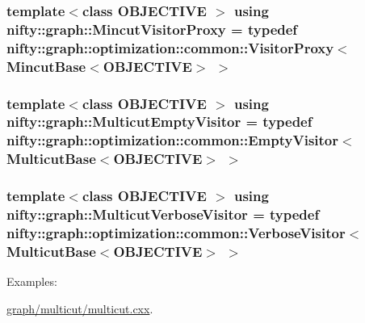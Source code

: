 \subsubsection[{Mincut\+Visitor\+Proxy}]{\setlength{\rightskip}{0pt plus 5cm}template$<$class O\+B\+J\+E\+C\+T\+I\+V\+E $>$ using {\bf nifty\+::graph\+::\+Mincut\+Visitor\+Proxy} = typedef {\bf nifty\+::graph\+::optimization\+::common\+::\+Visitor\+Proxy}$<$ {\bf Mincut\+Base}$<$O\+B\+J\+E\+C\+T\+I\+V\+E$>$ $>$}\label{namespacenifty_1_1graph_ac6c35595563f4188e7cbac37871801b8}
\hypertarget{namespacenifty_1_1graph_a37de21ae53be2952a5876727dadceed1}{}
\subsubsection[{Multicut\+Empty\+Visitor}]{\setlength{\rightskip}{0pt plus 5cm}template$<$class O\+B\+J\+E\+C\+T\+I\+V\+E $>$ using {\bf nifty\+::graph\+::\+Multicut\+Empty\+Visitor} = typedef {\bf nifty\+::graph\+::optimization\+::common\+::\+Empty\+Visitor}$<$ {\bf Multicut\+Base}$<$O\+B\+J\+E\+C\+T\+I\+V\+E$>$ $>$}\label{namespacenifty_1_1graph_a37de21ae53be2952a5876727dadceed1}
\hypertarget{namespacenifty_1_1graph_a8b139ea9e1b9c08234fb388f35bd9e75}{}
\subsubsection[{Multicut\+Verbose\+Visitor}]{\setlength{\rightskip}{0pt plus 5cm}template$<$class O\+B\+J\+E\+C\+T\+I\+V\+E $>$ using {\bf nifty\+::graph\+::\+Multicut\+Verbose\+Visitor} = typedef {\bf nifty\+::graph\+::optimization\+::common\+::\+Verbose\+Visitor}$<$ {\bf Multicut\+Base}$<$O\+B\+J\+E\+C\+T\+I\+V\+E$>$ $>$}\label{namespacenifty_1_1graph_a8b139ea9e1b9c08234fb388f35bd9e75}
\begin{Desc}
\item[Examples\+: ]\par
\hyperlink{graph_2multicut_2multicut_8cxx-example}{graph/multicut/multicut.\+cxx}.\end{Desc}
\hypertarget{namespacenifty_1_1graph_a33375e819f3dda82c6458bdc3cfbe81a}{}
